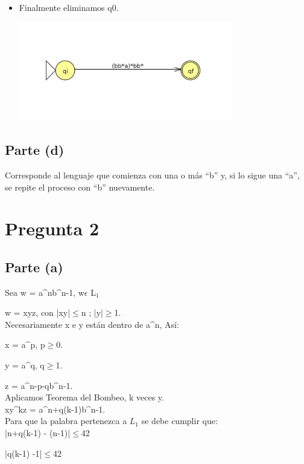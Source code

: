 \documentclass[11pt,letterpaper]{article}
\begin{document}
\begin{itemize}
\begin{center}
\end{center}
\item{Finalmente eliminamos q0.}
\begin{center}
\includegraphics[height=4.3cm]{tarea1-c4.png}
\end{center}
\end{itemize}

\subsection{Parte (d)}
Corresponde al lenguaje que comienza con una o más ``b'' y, si lo sigue una ``a'', se repite el proceso con ``b'' nuevamente.


\section{Pregunta 2}
\subsection{Parte (a)}
Sea w = a^nb^{n-1}, w$ \epsilon $ L$_{1}$

w = xyz, con |xy|$\leqslant$n ; |y|$\geqslant$1.
 \\

Necesariamente x e y están dentro de a^n, As$í$:

x = a^p, p$\geqslant$0.

y = a^q, q$\geqslant$1.

z = a^{n-p-q}b^{n-1}.
 \\

Aplicamos Teorema del Bombeo, k veces y.
 \\
 
xy^kz = a^{n+q(k-1)}b^{n-1}.
 \\

Para que la palabra pertenezca a $L_{1}$ se debe cumplir que:
 \\
 
|n+q(k-1) - (n-1)|$\leqslant$42

|q(k-1) -1|$\leqslant$42
 \\
 
\end{document}
